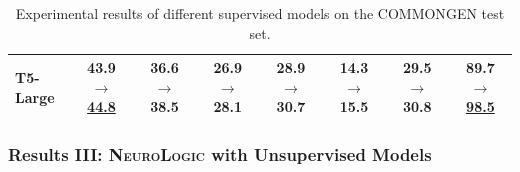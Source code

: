 \documentclass[10pt,aspectratio=43]{beamer}
\newcommand{\methodshort}{\frenchspacing\textsc{NeuroLogic}\xspace}
\begin{document}
\begin{frame}
\begin{table}[!t]
{\begin{tabular}{l|c|c c|c|c c|c}
                T5-Large  %
                &43.9 $\rightarrow$ \underline{44.8}&36.6 $\rightarrow$ 38.5&26.9 $\rightarrow$ 28.1&28.9 $\rightarrow$ 30.7&14.3 $\rightarrow$ 15.5&29.5 $\rightarrow$ 30.8&89.7 $\rightarrow$ \underline{98.5}\\
                \bottomrule
            \end{tabular}}
            \caption{Experimental results of different supervised models on the C{\scriptsize OMMON}G{\scriptsize EN} test set.}
            \label{tab:results2}
        \end{table}
    \end{frame}
    
    \begin{frame}
        \frametitle{\textbf{Results III: \methodshort{} with Unsupervised Models}}
        \begin{table}[!t]
            \caption{Experimental results in zero-shot (unsupervised) setting on the C{\scriptsize OMMON}G{\scriptsize EN} test set with and without language domain adaption.}
            \label{tab:results3}
        \end{table}
    \end{frame}
\end{document}
